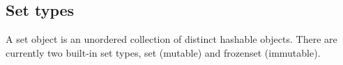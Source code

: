 %

\subsection{Set types}
A set object is an unordered collection of distinct hashable objects. 
There are currently two built-in set types, set (mutable) and frozenset (immutable).

%